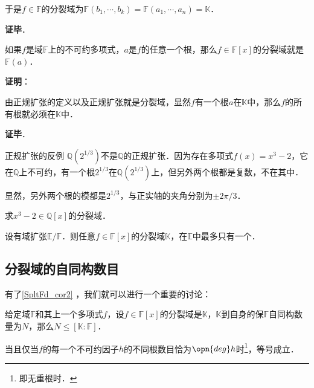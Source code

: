 于是$f\in\mathbb{F}$的分裂域为$\mathbb{F}(b_1, \cdots, b_k)=\mathbb{F}(a_1, \cdots, a_n)=\mathbb{K}$．

\textbf{证毕}．


\begin{corollary}{}\label{SpltFd_cor2}
如果$f$是域$\mathbb{F}$上的不可约多项式，$a$是$f$的任意一个根，那么$f\in\mathbb{F}[x]$的分裂域就是$\mathbb{F}(a)$．
\end{corollary}

\textbf{证明}：

由正规扩张的定义以及正规扩张就是分裂域，显然$f$有一个根$a$在$\mathbb{K}$中，那么$f$的所有根就必须在$\mathbb{K}$中．

\textbf{证毕}．



\begin{example}{正规扩张的反例}
$\mathbb{Q}(2^{1/3})$不是$\mathbb{Q}$的正规扩张．因为存在多项式$f(x)=x^3-2$，它在$\mathbb{Q}$上不可约，有一个根$2^{1/3}$在$\mathbb{Q}(2^{1/3})$上，但另外两个根都是复数，不在其中．

显然，另外两个根的模都是$2^{1/3}$，与正实轴的夹角分别为$\pm 2\pi/3$．
\end{example}

\begin{exercise}{}
求$x^3-2\in\mathbb{Q}[x]$的分裂域．
\end{exercise}



\begin{corollary}{}
设有域扩张$\mathbb{E}/\mathbb{F}$．则任意$f\in\mathbb{F}[x]$的分裂域$\mathbb{K}$，在$\mathbb{E}$中最多只有一个．
\end{corollary}

\subsection{分裂域的自同构数目}



有了\autoref{SpltFd_cor2} ，我们就可以进行一个重要的讨论：


\begin{theorem}{}\label{SpltFd_the1}
给定域$\mathbb{F}$和其上一个多项式$f$，设$f\in\mathbb{F}[x]$的分裂域是$\mathbb{K}$，$\mathbb{K}$到自身的保$\mathbb{F}$自同构数量为$N$，那么$N\leq[\mathbb{K}:\mathbb{F}]$．

当且仅当$f$的每一个不可约因子$h$的不同根数目恰为$\opn{deg}h$时\footnote{即无重根时．}，等号成立．
\end{theorem}

